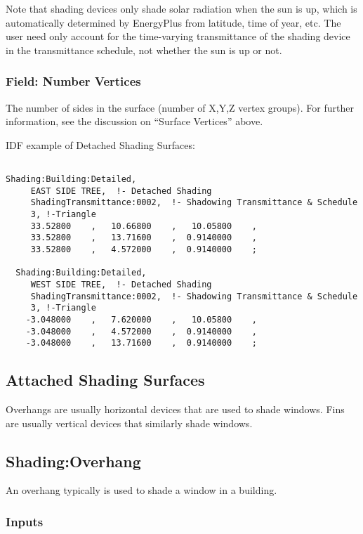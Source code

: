 Note that shading devices only shade solar radiation when the sun is up, which is automatically determined by EnergyPlus from latitude, time of year, etc. The user need only account for the time-varying transmittance of the shading device in the transmittance schedule, not whether the sun is up or not.

\subsubsection{Field: Number Vertices}\label{field-number-vertices}

The number of sides in the surface (number of X,Y,Z vertex groups). For further information, see the discussion on ``Surface Vertices'' above.

IDF example of Detached Shading Surfaces:

\begin{lstlisting}

Shading:Building:Detailed,
     EAST SIDE TREE,  !- Detached Shading
     ShadingTransmittance:0002,  !- Shadowing Transmittance & Schedule
     3, !-Triangle
     33.52800    ,   10.66800    ,   10.05800    ,
     33.52800    ,   13.71600    ,  0.9140000    ,
     33.52800    ,   4.572000    ,  0.9140000    ;

  Shading:Building:Detailed,
     WEST SIDE TREE,  !- Detached Shading
     ShadingTransmittance:0002,  !- Shadowing Transmittance & Schedule
     3, !-Triangle
    -3.048000    ,   7.620000    ,   10.05800    ,
    -3.048000    ,   4.572000    ,  0.9140000    ,
    -3.048000    ,   13.71600    ,  0.9140000    ;
\end{lstlisting}

\subsection{Attached Shading Surfaces}\label{attached-shading-surfaces}

Overhangs are usually horizontal devices that are used to shade windows. Fins are usually vertical devices that similarly shade windows.

\subsection{Shading:Overhang}\label{shadingoverhang}

An overhang typically is used to shade a window in a building.

\subsubsection{Inputs}\label{inputs-26-003}


